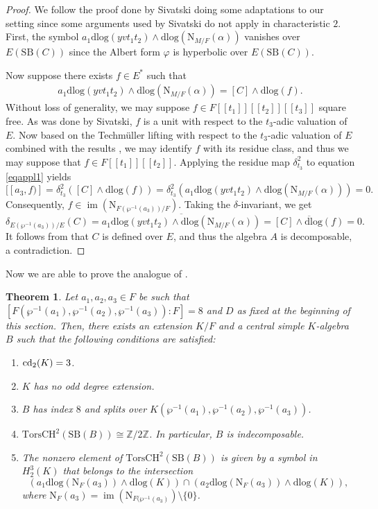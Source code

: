 \documentclass{amsart}
\newtheorem{theorem}[definition]{Theorem}
\numberwithin{equation}{section}
\newcommand{\Z}{\mathbb{Z}}
\newcommand{\im}{\operatorname{im}}
\newcommand{\dbrack}[1]{[\![#1]\!]}
\newcommand{\norm}{\mathrm{N}}
\newcommand{\dlog}{\mathrm{dlog}}
\newcommand{\torsChow}{\mathrm{Tors CH}^2}
\newcommand{\SevBrauer}{\mathrm{SB}}
\renewcommand{\phi}{\varphi}
\begin{document}
\begin{proof}
	We follow the proof done by Sivatski doing some adaptations to our setting since some arguments used by Sivatski do not apply in 	characteristic $2$. 
	First, the symbol $a_1 \dlog(yvt_1t_2) \wedge \dlog(\norm_{M/F}(\alpha))$ vanishes over $E(\SevBrauer(C))$ since the Albert form $\phi$ is hyperbolic over $E(\SevBrauer(C))$.

	Now suppose there  exists $f\in E^\ast$ such that
	\begin{align}\label{eqappl1}
		a_1\dlog(yvt_1t_2)\wedge \dlog(\norm_{M/F}(\alpha))= [C]\wedge \dlog(f).
	\end{align}
	Without loss of generality, we may suppose $f\in F \dbrack{t_1}\dbrack{t_2}\dbrack{t_3}$ square free. 
	As was done by Sivatski, $f$ is a unit with respect to the $t_3$-adic valuation of $E$. 
	Now based on the Techm\"uller lifting with respect to the $t_3$-adic valuation of $E$ combined with the results \cite[Theorem A.19, Corollary A.21]{LaghribiMaitiRationalFunctionFields}, we may identify $f$ with its residue class, and thus we may suppose that $f\in F[[t_1]][[t_2]]$. 
	Applying the residue map $\delta_{t_3}^2$ to equation \eqref{eqappl1} yields
	\[[[a_3, f)]=\delta_{t_3}^2([C]\wedge \dlog(f))=\delta_{t_3}^2(a_1\dlog(yvt_1t_2)\wedge \dlog(\norm_{M/F}(\alpha)))=0.\]
	Consequently, $f\in \im(\norm_{F(\wp^{-1}(a_3))/F})$. 
	Taking the $\delta$-invariant, we get
	\[\delta_{E(\wp^{-1}(a_3))/E}(C)=\overline{a_1\dlog(yvt_1t_2)\wedge \dlog(\norm_{M/F}(\alpha))}=\overline{[C]\wedge \dlog(f)}=0.\]
	It follows from \cite[Theorem 3.6]{BarryChapmanLaghribi_DescentBiquaternion} that $C$ is defined over $E$, and thus the algebra $A$ is decomposable, a contradiction.
\end{proof}

Now we are able to prove the analogue of \cite[Theorem 4.2]{Sivatski_CohoInv}.
\begin{theorem}
	Let $a_1, a_2, a_3\in F$ be such that $[F(\wp^{-1}(a_1), \wp^{-1}(a_2), \wp^{-1}(a_3)):F]=8$ and $D$ as fixed at the beginning of this section. 
	Then, there exists an extension $K/F$ and a central simple $K$-algebra $B$ such that the following conditions are satisfied:
	\begin{enumerate}[label=(\arabic*)]
		\item ${\rm cd}_2(K)=3$.
		\item $K$ has no odd degree extension.
		\item $B$ has index $8$ and splits over $K(\wp^{-1}(a_1), \wp^{-1}(a_2), \wp^{-1}(a_3))$.
		\item $\torsChow(\SevBrauer(B)) \cong \Z/2\Z$. 
			In particular, $B$ is indecomposable.
		\item The nonzero element of $\torsChow(\SevBrauer(B))$ is given by a symbol in $H_2^3(K)$ that belongs to the intersection
		\[\left(a_1\dlog(\norm_F(a_3))\wedge \dlog(K)\right) \cap \left(a_2\dlog(\norm_F(a_3))\wedge \dlog(K)\right),\]
		where $\norm_F(a_3) = \im(\norm_{F(\wp^{-1}(a_3)}) \setminus \{0\}$.
	\end{enumerate}
\end{theorem}
\end{document}

